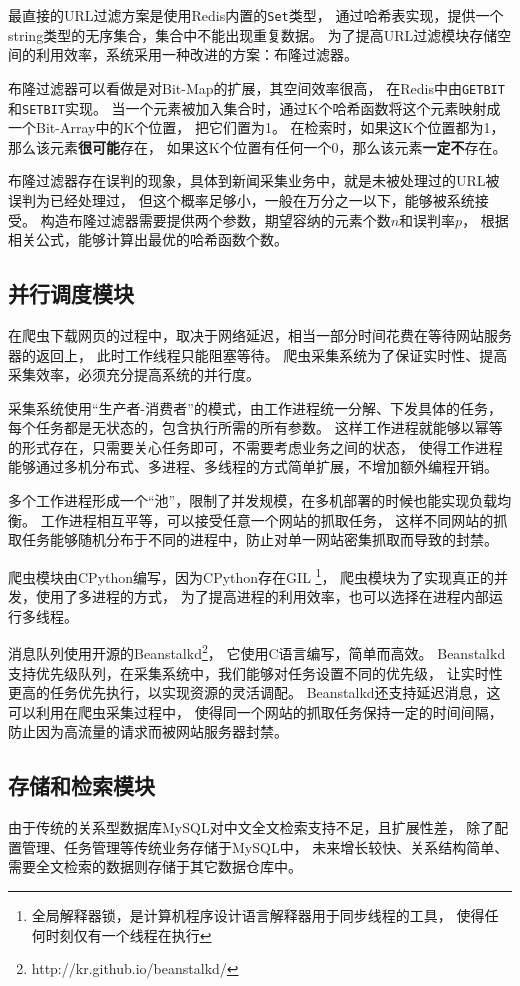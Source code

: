 最直接的URL过滤方案是使用Redis内置的\texttt{Set}类型，
通过哈希表实现，提供一个string类型的无序集合，集合中不能出现重复数据。
为了提高URL过滤模块存储空间的利用效率，系统采用一种改进的方案：布隆过滤器。

布隆过滤器可以看做是对Bit-Map的扩展，其空间效率很高，
在Redis中由\texttt{GETBIT}和\texttt{SETBIT}实现。
当一个元素被加入集合时，通过K个哈希函数将这个元素映射成一个Bit-Array中的K个位置，
把它们置为1。
在检索时，如果这K个位置都为1，那么该元素\textbf{很可能}存在，
如果这K个位置有任何一个0，那么该元素\textbf{一定不}存在。

布隆过滤器存在误判的现象，具体到新闻采集业务中，就是未被处理过的URL被误判为已经处理过，
但这个概率足够小，一般在万分之一以下，能够被系统接受。
构造布隆过滤器需要提供两个参数，期望容纳的元素个数$n$和误判率$p$，
根据相关公式，能够计算出最优的哈希函数个数。

\subsection{并行调度模块}
在爬虫下载网页的过程中，取决于网络延迟，相当一部分时间花费在等待网站服务器的返回上，
此时工作线程只能阻塞等待。
爬虫采集系统为了保证实时性、提高采集效率，必须充分提高系统的并行度。

采集系统使用“生产者-消费者”的模式，由工作进程统一分解、下发具体的任务，
每个任务都是无状态的，包含执行所需的所有参数。
这样工作进程就能够以幂等的形式存在，只需要关心任务即可，不需要考虑业务之间的状态，
使得工作进程能够通过多机分布式、多进程、多线程的方式简单扩展，不增加额外编程开销。

多个工作进程形成一个“池”，限制了并发规模，在多机部署的时候也能实现负载均衡。
工作进程相互平等，可以接受任意一个网站的抓取任务，
这样不同网站的抓取任务能够随机分布于不同的进程中，防止对单一网站密集抓取而导致的封禁。

爬虫模块由CPython编写，因为CPython存在GIL
\footnote{全局解释器锁，是计算机程序设计语言解释器用于同步线程的工具，
使得任何时刻仅有一个线程在执行}，
爬虫模块为了实现真正的并发，使用了多进程的方式，
为了提高进程的利用效率，也可以选择在进程内部运行多线程。

消息队列使用开源的Beanstalkd\footnote{http://kr.github.io/beanstalkd/}，
它使用C语言编写，简单而高效。
Beanstalkd支持优先级队列，在采集系统中，我们能够对任务设置不同的优先级，
让实时性更高的任务优先执行，以实现资源的灵活调配。
Beanstalkd还支持延迟消息，这可以利用在爬虫采集过程中，
使得同一个网站的抓取任务保持一定的时间间隔，
防止因为高流量的请求而被网站服务器封禁。

\subsection{存储和检索模块}
由于传统的关系型数据库MySQL对中文全文检索支持不足，且扩展性差，
除了配置管理、任务管理等传统业务存储于MySQL中，
未来增长较快、关系结构简单、需要全文检索的数据则存储于其它数据仓库中。

